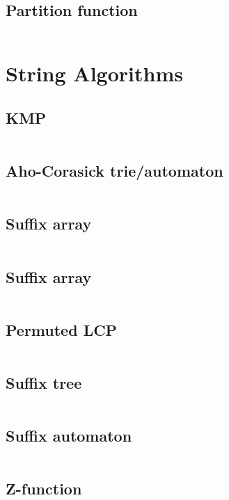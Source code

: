 \documentclass[letterpaper,landscape]{article}
\begin{document}
\begin{multicols*}{2}
  \subsection{Partition function}
  \inputminted{cpp}{src/partition.cpp}
  
  \section{String Algorithms}

  \subsection{KMP}
  \inputminted{cpp}{src/string_KMP.cpp}

  \subsection{Aho-Corasick trie/automaton}
  \inputminted{cpp}{src/string_AC.cpp}

  \subsection{Suffix array}
  \inputminted{cpp}{src/string_SA.cpp}

  \subsection{Suffix array}
  \inputminted{cpp}{src/string_SA_nlogn_pear.cpp}

  \subsection{Permuted LCP}
  \inputminted{cpp}{src/string_kasai.cpp}
  
  \subsection{Suffix tree}
  \inputminted{cpp}{src/string_ukkonen.cpp}

  \subsection{Suffix automaton}
  \inputminted{cpp}{src/string_suffix_automaton.cpp}
  
  \subsection{Z-function}
  \inputminted{cpp}{src/string_z_function.cpp}


\end{multicols*}
\end{document}
